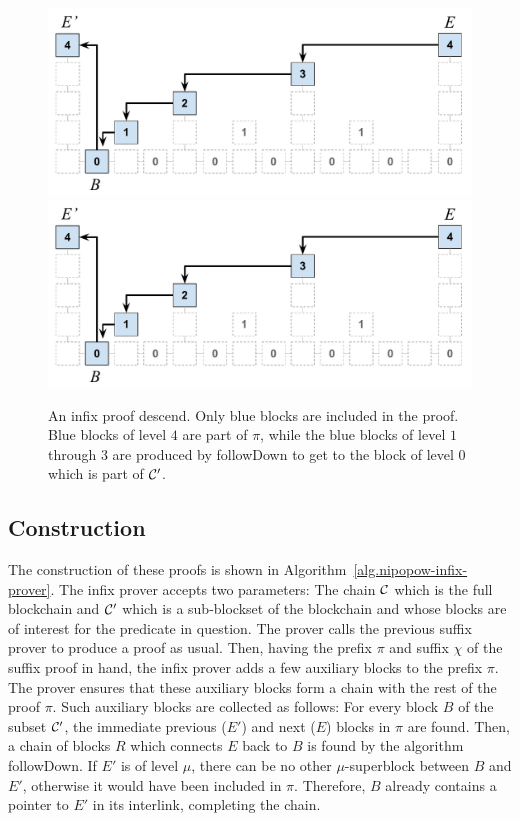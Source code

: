 \begin{figure}[h]
    \caption{An infix proof descend. Only blue blocks are included in the proof.
    Blue blocks of level $4$ are part of $\pi$, while the blue blocks of level
    $1$ through $3$ are produced by followDown to get to the block of level $0$
    which is part of $\mathcal{C}'$.}
    \centering
    \iftwocolumn
        \includegraphics[width=0.9\columnwidth,keepaspectratio]{figures/infix.pdf}
    \else
        \includegraphics[width=0.7\columnwidth,keepaspectratio]{figures/infix.pdf}
    \fi
    \label{fig.infix}
\end{figure}

\subsection{Construction}

The construction of these proofs is shown in
Algorithm~\ref{alg.nipopow-infix-prover}. The infix prover accepts two
parameters: The chain $\mathcal{C}$ which is the full blockchain and $\mathcal{C}'$ which
is a sub-blockset of the blockchain and whose blocks are of interest for the
predicate in question. The prover calls the previous suffix prover to produce a
proof as usual. Then, having the prefix $\pi$ and suffix $\chi$ of the suffix
proof in hand, the infix prover adds a few auxiliary blocks to the prefix $\pi$.
The prover ensures that these auxiliary blocks form a chain with the rest of the
proof $\pi$. Such auxiliary blocks are collected as follows: For every block $B$
of the subset $\mathcal{C}'$, the immediate previous ($E'$) and next ($E$) blocks
in $\pi$ are found. Then, a chain of blocks $R$ which connects $E$ back to $B$
is found by the algorithm \textsf{followDown}. If $E'$ is of level $\mu$, there
can be no other $\mu$-superblock between $B$ and $E'$, otherwise it would have
been included in $\pi$. Therefore, $B$ already contains a pointer to $E'$ in its
interlink, completing the chain.

